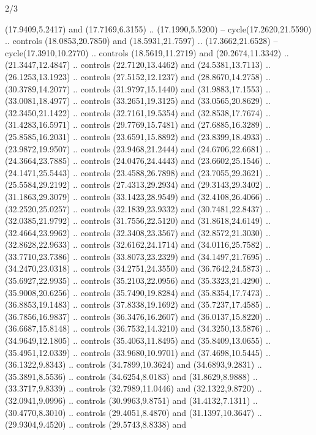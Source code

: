 \begin{flagdescription}{2/3}
\begin{scope}[yshift=\flagwidth,scale=\flagwidth/1241.93737]
\begin{scope}[y=-1mm, x=1mm,draw=gold,fill=blue,line join=miter,miter limit=4,line width=1.8\lw]
\begin{scope}[y=1mm, x=1mm, yscale=-1,shift={(573.68mm+\str,145.75)}]
\begin{scope}[scale=1.35,shift={(-9,-3)}]
\begin{scope}[scale=0.55]
\begin{scope}[scale=1.333]
    (17.9409,5.2417) and (17.7169,6.3155) .. (17.1990,5.5200) --
    cycle(17.2620,21.5590) .. controls (18.0853,20.7850) and (18.5931,21.7597) ..
    (17.3662,21.6528) -- cycle(17.3910,10.2770) .. controls (18.5619,11.2719) and
    (20.2674,11.3342) .. (21.3447,12.4847) .. controls (22.7120,13.4462) and
    (24.5381,13.7113) .. (26.1253,13.1923) .. controls (27.5152,12.1237) and
    (28.8670,14.2758) .. (30.3789,14.2077) .. controls (31.9797,15.1440) and
    (31.9883,17.1553) .. (33.0081,18.4977) .. controls (33.2651,19.3125) and
    (33.0565,20.8629) .. (32.3450,21.1422) .. controls (32.7161,19.5354) and
    (32.8538,17.7674) .. (31.4283,16.5971) .. controls (29.7769,15.7481) and
    (27.6885,16.3289) .. (25.8585,16.2031) .. controls (23.6591,15.8892) and
    (23.8399,18.4933) .. (23.9872,19.9507) .. controls (23.9468,21.2444) and
    (24.6706,22.6681) .. (24.3664,23.7885) .. controls (24.0476,24.4443) and
    (23.6602,25.1546) .. (24.1471,25.5443) .. controls (23.4588,26.7898) and
    (23.7055,29.3621) .. (25.5584,29.2192) .. controls (27.4313,29.2934) and
    (29.3143,29.3402) .. (31.1863,29.3079) .. controls (33.1423,28.9549) and
    (32.4108,26.4066) .. (32.2520,25.0257) .. controls (32.1839,23.9332) and
    (30.7481,22.8437) .. (32.0385,21.9792) .. controls (31.7556,22.5120) and
    (31.8618,24.6149) .. (32.4664,23.9962) .. controls (32.3408,23.3567) and
    (32.8572,21.3030) .. (32.8628,22.9633) .. controls (32.6162,24.1714) and
    (34.0116,25.7582) .. (33.7710,23.7386) .. controls (33.8073,23.2329) and
    (34.1497,21.7695) .. (34.2470,23.0318) .. controls (34.2751,24.3550) and
    (36.7642,24.5873) .. (35.6927,22.9935) .. controls (35.2103,22.0956) and
    (35.3323,21.4290) .. (35.9008,20.6256) .. controls (35.7490,19.8284) and
    (35.8354,17.7473) .. (36.8853,19.1483) .. controls (37.8338,19.1692) and
    (35.7237,17.4585) .. (36.7856,16.9837) .. controls (36.3476,16.2607) and
    (36.0137,15.8220) .. (36.6687,15.8148) .. controls (36.7532,14.3210) and
    (34.3250,13.5876) .. (34.9649,12.1805) .. controls (35.4063,11.8495) and
    (35.8409,13.0655) .. (35.4951,12.0339) .. controls (33.9680,10.9701) and
    (37.4698,10.5445) .. (36.1322,9.8343) .. controls (34.7899,10.3624) and
    (34.6893,9.2831) .. (35.3891,8.5536) .. controls (34.6254,8.0183) and
    (31.8629,8.9888) .. (33.3717,9.8339) .. controls (32.7989,11.0446) and
    (32.1322,9.8720) .. (32.0941,9.0996) .. controls (30.9963,9.8751) and
    (31.4132,7.1311) .. (30.4770,8.3010) .. controls (29.4051,8.4870) and
    (31.1397,10.3647) .. (29.9304,9.4520) .. controls (29.5743,8.8338) and

\end{scope}
\end{scope}
\end{scope}
\end{scope}
\end{scope}
\end{scope}
\end{flagdescription}
